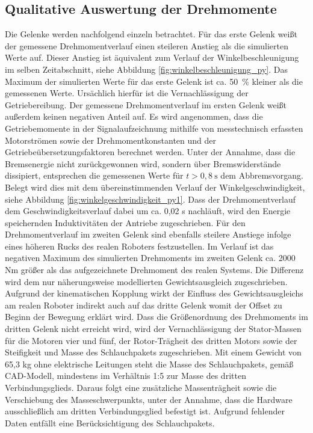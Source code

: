 \subsection*{Qualitative Auswertung der Drehmomente}
Die Gelenke werden nachfolgend einzeln betrachtet. Für das erste Gelenk weißt der gemessene Drehmomentverlauf einen steileren Anstieg als die simulierten Werte auf. Dieser Anstieg ist äquivalent zum Verlauf der Winkelbeschleunigung im selben Zeitabschnitt, siehe Abbildung \ref{fig:winkelbeschleunigung_py}. Das Maximum der simulierten Werte für das erste Gelenk ist ca. 50~\% kleiner als die gemessenen Werte. Ursächlich hierfür ist die Vernachlässigung der Getriebereibung. Der gemessene Drehmomentverlauf im ersten Gelenk weißt außerdem keinen negativen Anteil auf. Es wird angenommen, dass die Getriebemomente in der Signalaufzeichnung mithilfe von messtechnisch erfassten Motorströmen sowie der Drehmomentkonstanten und der Getriebeübersetzungsfaktoren berechnet werden. Unter der Annahme, dass die Bremsenergie nicht zurückgewonnen wird, sondern über Bremswiderstände dissipiert, entsprechen die gemessenen Werte für $t>0,8~\text{s}$ dem  Abbremsvorgang. Belegt wird dies mit dem übereinstimmenden Verlauf der Winkelgeschwindigkeit, siehe Abbildung \ref{fig:winkelgeschwindigkeit_py1}. Dass der Drehmomentverlauf dem Geschwindigkeitsverlauf dabei um ca. 0,02 s nachläuft, wird den Energie speichernden Induktivitäten der Antriebe zugeschrieben. Für den Drehmomentverlauf im zweiten Gelenk sind ebenfalls steilere Anstiege infolge eines höheren Rucks des realen Roboters festzustellen. Im Verlauf ist das negativen Maximum des simulierten Drehmoments im zweiten Gelenk ca. 2000 Nm größer als das aufgezeichnete Drehmoment des realen Systems. Die Differenz wird dem nur näherungsweise modellierten Gewichtsausgleich zugeschrieben. Aufgrund der kinematischen Kopplung wirkt der Einfluss des Gewichtsausgleichs am realen Roboter indirekt auch auf das dritte Gelenk womit der Offset zu Beginn der Bewegung erklärt wird. Dass die Größenordnung des Drehmoments im dritten Gelenk nicht erreicht wird, wird der Vernachlässigung der Stator-Massen für die Motoren vier und fünf, der Rotor-Trägheit des dritten Motors sowie der Steifigkeit und Masse des Schlauchpakets zugeschrieben. Mit einem Gewicht von 65,3 kg ohne elektrische Leitungen steht die Masse des Schlauchpakets, gemäß CAD-Modell, mindestens im Verhältnis 1:5 zur Masse des dritten Verbindungsglieds. Daraus folgt eine zusätzliche Massenträgheit sowie die Verschiebung des Masseschwerpunkts, unter der Annahme, dass die Hardware ausschließlich am dritten Verbindungsglied befestigt ist. Aufgrund fehlender Daten entfällt eine Berücksichtigung des Schlauchpakets. 

